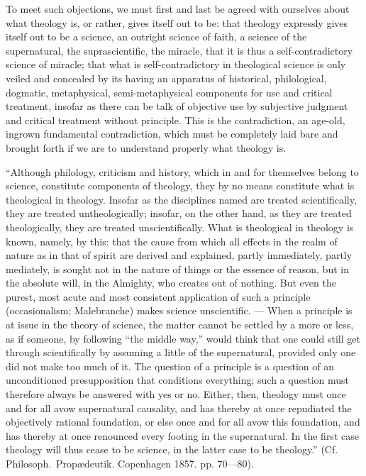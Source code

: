\documentclass[12pt]{book}
\newcommand{\opage}[1]{\marginnote{\footnotesize\textit{[#1]}}}
\begin{document}
To meet such objections, we must first and last be agreed with ourselves
about what theology is, or rather, gives itself out to be: that theology
expressly gives itself out to be a science, an outright science of faith, a
science of the supernatural, the suprascientific, the miracle, that it is thus
a self-contradictory science of miracle; that what is self-contradictory in
theological science is only veiled and concealed by its having an apparatus
of historical, philological, dogmatic, metaphysical, semi-metaphysical
components for use and critical treatment, insofar as there can be talk of
objective use by subjective judgment and critical treatment without principle.
This is the contradiction, an age-old, ingrown fundamental contradiction,
which must be completely laid bare and brought forth if we are to understand
properly what theology is.

``Although philology, criticism and history, which in and for themselves
belong to science, constitute components of theology, they by no means
constitute what is theological in theology. Insofar as the disciplines named
are treated scientifically, they are treated untheologically; insofar, on the
other hand, as they are treated theologically, they are treated
unscientifically. What is theological in theology is known, namely, by this:
that the cause from which all effects in the realm of nature as in that of
spirit are derived and explained, partly immediately, partly mediately, is
sought not in the nature of things or the essence of reason, but in the
absolute will, in the Almighty, who creates out of nothing. But even the
purest, most acute and most consistent application of such a
\opage{275}\setcounter{footnote}{0}%
principle (occasionalism; Malebranche) makes science unscientific. --- When a
principle is at issue in the theory of science, the matter cannot be settled
by a more or less, as if someone, by following ``the middle way,'' would
think that one could still get through scientifically by assuming a little of
the supernatural, provided only one did not make too much of it. The question
of a principle is a question of an unconditioned presupposition that
conditions everything; such a question must therefore always be answered with
yes or no. Either, then, theology must once and for all avow supernatural
causality, and has thereby at once repudiated the objectively rational
foundation, or else once and for all avow this foundation, and has thereby at
once renounced every footing in the supernatural. In the first case theology
will thus cease to be science, in the latter case to be theology.'' (Cf.
Philosoph.\ Propædeutik. Copenhagen 1857. pp. 70---80).
\end{document}
